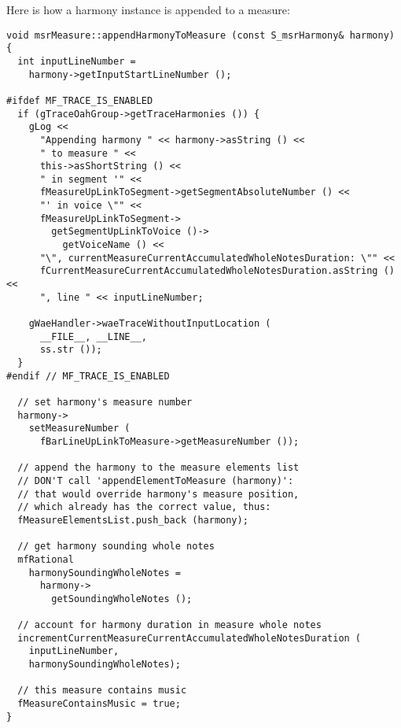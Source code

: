 Here is how a harmony instance is appended to a measure:
\begin{lstlisting}[language=CPlusPlus]
void msrMeasure::appendHarmonyToMeasure (const S_msrHarmony& harmony)
{
  int inputLineNumber =
    harmony->getInputStartLineNumber ();

#ifdef MF_TRACE_IS_ENABLED
  if (gTraceOahGroup->getTraceHarmonies ()) {
    gLog <<
      "Appending harmony " << harmony->asString () <<
      " to measure " <<
      this->asShortString () <<
      " in segment '" <<
      fMeasureUpLinkToSegment->getSegmentAbsoluteNumber () <<
      "' in voice \"" <<
      fMeasureUpLinkToSegment->
        getSegmentUpLinkToVoice ()->
          getVoiceName () <<
      "\", currentMeasureCurrentAccumulatedWholeNotesDuration: \"" <<
      fCurrentMeasureCurrentAccumulatedWholeNotesDuration.asString () <<
      ", line " << inputLineNumber;

    gWaeHandler->waeTraceWithoutInputLocation (
      __FILE__, __LINE__,
      ss.str ());
  }
#endif // MF_TRACE_IS_ENABLED

  // set harmony's measure number
  harmony->
    setMeasureNumber (
      fBarLineUpLinkToMeasure->getMeasureNumber ());

  // append the harmony to the measure elements list
  // DON'T call 'appendElementToMeasure (harmony)':
  // that would override harmony's measure position,
  // which already has the correct value, thus:
  fMeasureElementsList.push_back (harmony);

  // get harmony sounding whole notes
  mfRational
    harmonySoundingWholeNotes =
      harmony->
        getSoundingWholeNotes ();

  // account for harmony duration in measure whole notes
  incrementCurrentMeasureCurrentAccumulatedWholeNotesDuration (
    inputLineNumber,
    harmonySoundingWholeNotes);

  // this measure contains music
  fMeasureContainsMusic = true;
}
\end{lstlisting}

